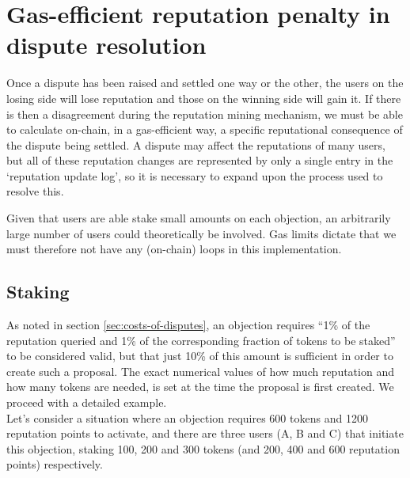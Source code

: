 \clearpage
\section{Gas-efficient reputation penalty in dispute resolution}\label{appendix:rep-transfer}

Once a dispute has been raised and settled one way or the other, the users on the losing side will lose reputation and those on the winning side will gain it. If there is then a disagreement during the reputation mining mechanism, we must be able to calculate on-chain, in a gas-efficient way, a specific reputational consequence of the dispute being settled. A dispute may affect the reputations of many users, but all of these reputation changes are represented by only a single entry in the `reputation update log', so it is necessary to expand upon the process used to resolve this.

Given that users are able stake small amounts on each objection, an arbitrarily large number of users could theoretically be involved. Gas limits dictate that we must therefore not have any (on-chain) loops in this implementation.

\subsection{Staking}

As noted in section \ref{sec:costs-of-disputes}, an objection requires ``1\% of the reputation queried and 1\% of the corresponding fraction of tokens to be staked'' to be considered valid, but that just 10\% of this amount is sufficient in order to create such a proposal. The exact numerical values of how much reputation and how many tokens are needed, is set at the time the proposal is first created. We proceed with a detailed example.\\
Let's consider a situation where an objection requires 600 tokens and 1200 reputation points to activate, and there are three users (A, B and C) that initiate this objection, staking 100, 200 and 300 tokens (and 200, 400 and 600 reputation points) respectively.  

